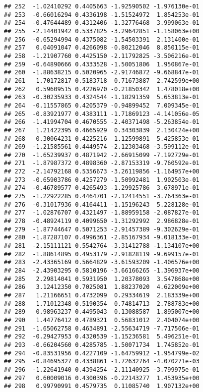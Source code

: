 \documentclass[
]{article}
\begin{document}
\begin{verbatim}
## 252  -1.02410292 0.4405663 -1.92590502 -1.976130e-01
## 253  -0.66016294 0.4336198 -1.51524972  1.854253e-01
## 254  -0.47644489 0.4312406 -1.32776468  3.999063e-01
## 255  -2.14401942 0.5337825 -3.29642851 -1.158063e+00
## 256  -0.65294994 0.4375082 -1.54503391  2.131400e-01
## 257   0.04091047 0.4266098 -0.80212046  8.850115e-01
## 258  -1.21907760 0.4425150 -2.11792825 -3.506216e-01
## 259  -0.64890666 0.4333528 -1.50051806  1.950867e-01
## 260  -1.88638215 0.5020965 -2.91746872 -9.668847e-01
## 261   1.70172817 0.5183718  0.71673887  2.742599e+00
## 262   0.59609515 0.4226970 -0.21850342  1.478018e+00
## 263  -0.30235933 0.4324544 -1.18291359  5.653813e-01
## 264  -0.11557865 0.4205379 -0.94899452  7.009345e-01
## 265  -0.83921977 0.4383111 -1.71869123 -4.141056e-05
## 266  -1.41994704 0.4670555 -2.40371498 -5.263854e-01
## 267   1.21422395 0.4665929  0.34303839  2.130424e+00
## 268  -0.30064231 0.4225216 -1.12599891  5.425853e-01
## 269  -1.21585561 0.4449574 -2.12303468 -3.599112e-01
## 270  -1.65239937 0.4871942 -2.66915099 -7.192729e-01
## 271  -1.87987372 0.4898360 -2.87153319 -9.760592e-01
## 272  -2.14792168 0.5356673 -3.26119856 -1.164957e+00
## 273  -0.65903786 0.4257279 -1.50992481  1.902503e-01
## 274  -0.46789577 0.4265493 -1.29925786  3.678971e-01
## 275  -1.22922285 0.4464701 -2.12414551 -3.764363e-01
## 276  -0.31017936 0.4164411 -1.15196243  5.228128e-01
## 277  -1.02876707 0.4321497 -1.88959158 -2.087827e-01
## 278  -0.48924119 0.4099650 -1.31292992  2.986828e-01
## 279  -1.87744647 0.5071253 -2.91457389 -9.302629e-01
## 280  -1.87287107 0.4996361 -2.85167934 -9.018133e-01
## 281  -2.15111121 0.5542764 -3.31412788 -1.134107e+00
## 282  -1.88614895 0.4953179 -2.91828119 -9.699157e-01
## 283  -2.43365169 0.5664829 -3.61593209 -1.406576e+00
## 284  -2.43903295 0.5810196 -3.66166265 -1.396937e+00
## 285   2.29814041 0.5931950  1.20378093  3.547868e+00
## 286   3.12412350 0.7025081  1.88237020  4.622009e+00
## 287   1.21166651 0.4732099  0.29334619  2.183339e+00
## 288   1.71012348 0.5190354  0.74814713  2.788783e+00
## 289   0.98963237 0.4495043  0.13088587  1.895007e+00
## 290   1.44776412 0.4789321  0.56831012  2.404074e+00
## 291  -1.65062758 0.4634891 -2.55634719 -7.717506e-01
## 292  -0.29427953 0.4320539 -1.15236581  5.496251e-01
## 293  -0.66204560 0.4285785 -1.50071734  1.745852e-01
## 294  -0.83531956 0.4227109 -1.64759912 -1.954799e-02
## 295  -0.84695327 0.4338861 -1.72632764 -4.070271e-03
## 296  -1.22641940 0.4394254 -2.11140925 -3.799975e-01
## 297   0.60009016 0.4300396 -0.22143277  1.453935e+00
## 298   0.99790991 0.4579735  0.11085740  1.907132e+00

\end{verbatim}
\end{document}
